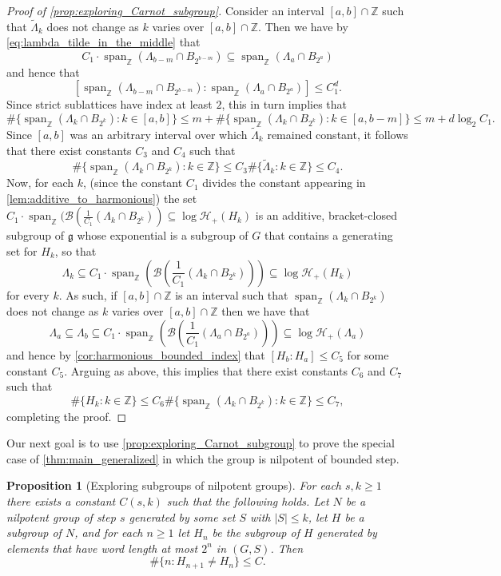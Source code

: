 \documentclass[11pt]{article}
\numberwithin{equation}{section}
\theoremstyle{plain}
\newtheorem{prop}[thm]{Proposition}
\theoremstyle{definition}
\theoremstyle{remark}
\numberwithin{equation}{section}
\newcommand{\Z}{\mathbb Z}
\numberwithin{equation}{section}
\newcommand{\spanZ}{\operatorname{span}_\Z}
\begin{document}
\begin{proof}[Proof of \cref{prop:exploring_Carnot_subgroup}]
\medskip

Consider an interval $[a,b]\cap \Z$ such that $\tilde \Lambda_k$ does not change as $k$ varies over $[a,b]\cap \Z$. 
%
Then we have by \eqref{eq:lambda_tilde_in_the_middle} that
\[
C_1\cdot \spanZ(\Lambda_{b-m} \cap B_{2^{b-m}}) \subseteq \spanZ(\Lambda_a\cap B_{2^a})
\]
and hence that
\[
[\spanZ(\Lambda_{b-m} \cap B_{2^{b-m}}):\spanZ(\Lambda_a\cap B_{2^a})]\leq C_1^d.
\]
Since strict sublattices have index at least $2$, this in turn implies that 
\[
\#\{\spanZ(\Lambda_{k} \cap B_{2^{k}}) : k \in [a,b]\} \leq m + \#\{\spanZ(\Lambda_{k} \cap B_{2^{k}}) : k \in [a,b-m]\} \leq m + d \log_2 C_1.
\]
Since $[a,b]$ was an arbitrary interval over which $\tilde \Lambda_k$ remained constant, it follows that there exist constants $C_3$ and $C_4$ such that
\[
\#\{\spanZ(\Lambda_{k} \cap B_{2^{k}}) : k \in \Z\} \leq C_3 \#\{\tilde \Lambda_k : k \in \Z\} \leq C_4.
\]
Now, for each $k$, (since the constant $C_1$ divides the constant appearing in \cref{lem:additive_to_harmonious}) the set $C_1 \cdot \spanZ(\mathscr{B}(\frac{1}{C_1} (\Lambda_k \cap B_{2^k})) \subseteq \log\mathscr{H}_+(H_k)$ is an additive, bracket-closed subgroup of $\mathfrak{g}$ whose exponential is a subgroup of $G$ that contains a generating set for $H_k$, so that
\[
\Lambda_k \subseteq C_1 \cdot \spanZ\left(\mathscr{B}\left(\frac{1}{C_1} (\Lambda_k \cap B_{2^k})\right)\right) \subseteq \log \mathscr{H}_+(H_k)
\]
for every $k$.
As such, if  $[a,b]\cap \Z$ is an interval such that $\operatorname{span}_\Z(\Lambda_k \cap B_{2^k})$ does not change as $k$ varies over $[a,b]\cap \Z$ then we have that
\[
\Lambda_a \subseteq \Lambda_b \subseteq C_1 \cdot \spanZ\left(\mathscr{B}\left(\frac{1}{C_1} (\Lambda_a \cap B_{2^a})\right)\right) \subseteq  \log \mathscr{H}_+(\Lambda_a)
%
\]
and hence by \cref{cor:harmonious_bounded_index} that $[H_b:H_a] \leq C_5$ for some constant $C_5$. Arguing as above, this implies that there exist constants $C_6$ and $C_7$ such that
\[
\#\{H_k :k\in \Z\} \leq C_6 \#\{\spanZ(\Lambda_{k} \cap B_{2^{k}}) : k \in \Z\}  \leq C_7,
\]
completing the proof. \qedhere
\end{proof}


Our next goal is to use \cref{prop:exploring_Carnot_subgroup} to prove the special case of \cref{thm:main_generalized} in which the group is nilpotent of bounded step.


\begin{prop}[Exploring subgroups of nilpotent groups]
\label{prop:main_nilpotent}
For each $s,k\geq 1$ there exists a constant $C(s,k)$ such that the following holds.
Let $N$ be a nilpotent group of step $s$ generated by some set $S$ with $|S|\leq k$, let $H$ be a subgroup of $N$, and for each $n\geq 1$ let $H_n$ be the subgroup of $H$ generated by elements that have word length at most $2^n$ in $(G,S)$. Then 
\[
\#\{n:H_{n+1}\neq H_n\} \leq C.
\]
\end{prop}
\end{document}
